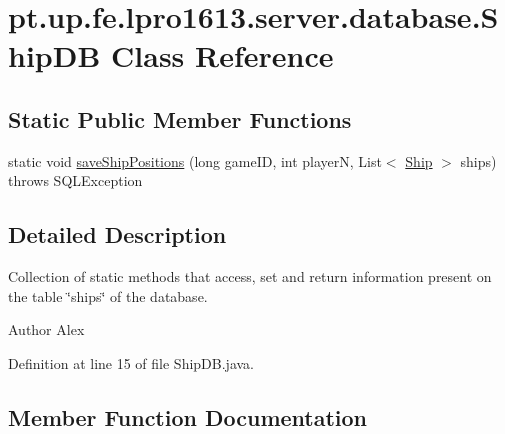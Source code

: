 \hypertarget{classpt_1_1up_1_1fe_1_1lpro1613_1_1server_1_1database_1_1_ship_d_b}{}\section{pt.\+up.\+fe.\+lpro1613.\+server.\+database.\+Ship\+DB Class Reference}
\label{classpt_1_1up_1_1fe_1_1lpro1613_1_1server_1_1database_1_1_ship_d_b}
\subsection*{Static Public Member Functions}
\begin{DoxyCompactItemize}
\item 
static void \hyperlink{classpt_1_1up_1_1fe_1_1lpro1613_1_1server_1_1database_1_1_ship_d_b_a1b7c2d5d84b479078cbb9b1de9445ae9}{save\+Ship\+Positions} (long game\+ID, int playerN, List$<$ \hyperlink{classpt_1_1up_1_1fe_1_1lpro1613_1_1sharedlib_1_1structs_1_1_ship}{Ship} $>$ ships)  throws S\+Q\+L\+Exception 
\end{DoxyCompactItemize}


\subsection{Detailed Description}
Collection of static methods that access, set and return information present on the table \char`\"{}ships\char`\"{} of the database.

\begin{DoxyAuthor}{Author}
Alex 
\end{DoxyAuthor}


Definition at line 15 of file Ship\+D\+B.\+java.



\subsection{Member Function Documentation}
\hypertarget{classpt_1_1up_1_1fe_1_1lpro1613_1_1server_1_1database_1_1_ship_d_b_a1b7c2d5d84b479078cbb9b1de9445ae9}{}\label{classpt_1_1up_1_1fe_1_1lpro1613_1_1server_1_1database_1_1_ship_d_b_a1b7c2d5d84b479078cbb9b1de9445ae9} 
